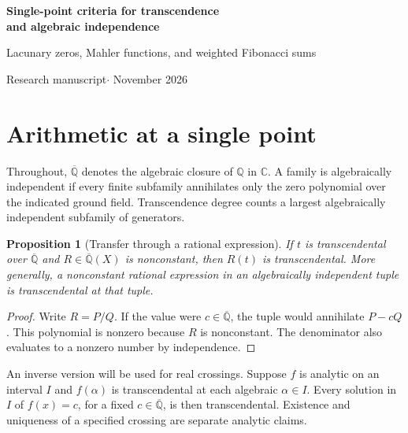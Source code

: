 \documentclass[11pt,a4paper]{article}
\newtheorem{proposition}[theorem]{Proposition}
\theoremstyle{definition}
\theoremstyle{remark}
\newcommand{\Q}{\mathbb Q}
\newcommand{\C}{\mathbb C}
\newcommand{\K}{\overline{\mathbb Q}}
\numberwithin{equation}{section}
\begin{document}
\begin{center}
{\Large\bfseries Single-point criteria for transcendence\\[3pt] and algebraic independence}\par
\vspace{8pt}
{\large Lacunary zeros, Mahler functions, and weighted Fibonacci sums}\par
\vspace{8pt}
{\small Research manuscript\quad $\cdot$ November 2026}
\end{center}
\begin{abstract}
We study three ways of turning information at one point into an arithmetic conclusion. For a sufficiently sparse integer power series, irreducible truncations and a degree argument give algebraic independence of a zero and the values of all positive-order derivatives there. For Mahler functions, functional equations identify the values that must be counted together, and specialization transfers independence to algebraic arguments. For the bilateral Fibonacci sums with Chang's real cubic weight, we determine the transcendence degree of every finite subfamily. A subfamily has rank at most two if it contains no multiple-of-three index and at most three otherwise. The first two sums satisfy $T_2=T_1^2$, so together they contribute one independent generator. We give the explicit transcendence proof for Chang's common value, the joint derivative results for Stern's series and its twist, and the transcendence of specified real crossings of Lambert series and continued fractions.
\end{abstract}
\tableofcontents
\section{Arithmetic at a single point}\label{sec:transfer}
Throughout, $\K$ denotes the algebraic closure of $\Q$ in $\C$. A family is algebraically independent if every finite subfamily annihilates only the zero polynomial over the indicated ground field. Transcendence degree counts a largest algebraically independent subfamily of generators.

\begin{proposition}[Transfer through a rational expression]\label{prop:transfer}
If $t$ is transcendental over $\K$ and $R\in\K(X)$ is nonconstant, then $R(t)$ is transcendental. More generally, a nonconstant rational expression in an algebraically independent tuple is transcendental at that tuple.
\end{proposition}
\begin{proof}
Write $R=P/Q$. If the value were $c\in\K$, the tuple would annihilate $P-cQ$. This polynomial is nonzero because $R$ is nonconstant. The denominator also evaluates to a nonzero number by independence.
\end{proof}
An inverse version will be used for real crossings. Suppose $f$ is analytic on an interval $I$ and $f(\alpha)$ is transcendental at each algebraic $\alpha\in I$. Every solution in $I$ of $f(x)=c$, for a fixed $c\in\K$, is then transcendental. Existence and uniqueness of a specified crossing are separate analytic claims.
\end{document}

